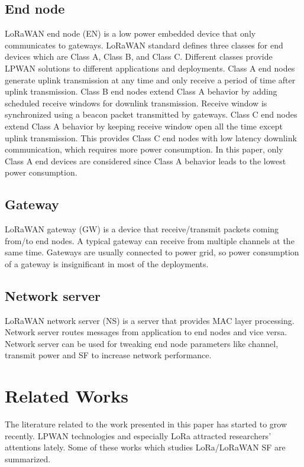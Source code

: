 \documentclass[conference]{IEEEtran}
\begin{document}
\subsection{End node}
LoRaWAN end node (EN) is a low power embedded device that only communicates to gateways. LoRaWAN standard defines three classes for end devices which are Class A, Class B, and Class C. Different classes provide LPWAN solutions to different applications and deployments. Class A end nodes generate uplink transmission at any time and only receive a period of time after uplink transmission. Class B end nodes extend Class A behavior by adding scheduled receive windows for downlink transmission. Receive window is synchronized using a beacon packet transmitted by gateways. Class C end nodes extend Class A behavior by keeping receive window open all the time except uplink transmission. This provides Class C end nodes with low latency downlink communication, which requires more power consumption. In this paper, only Class A end devices are considered since Class A behavior leads to the lowest power consumption.

\subsection{Gateway}
LoRaWAN gateway (GW) is a device that receive/transmit packets coming from/to end nodes. A typical gateway can receive from multiple channels at the same time. Gateways are usually connected to power grid, so power consumption of a gateway is insignificant in most of the deployments.

\subsection{Network server}
LoRaWAN network server (NS) is a server that provides MAC layer processing. Network server routes messages from application to end nodes and vice versa. Network server can be used for tweaking end node parameters like channel, transmit power and SF to increase network performance.


\section{Related Works} \label{Related Works}
The literature related to the work presented in this paper has started to grow recently. LPWAN technologies and especially LoRa attracted researchers’ attentions lately. Some of these works which studies LoRa/LoRaWAN SF are summarized.
\end{document}
